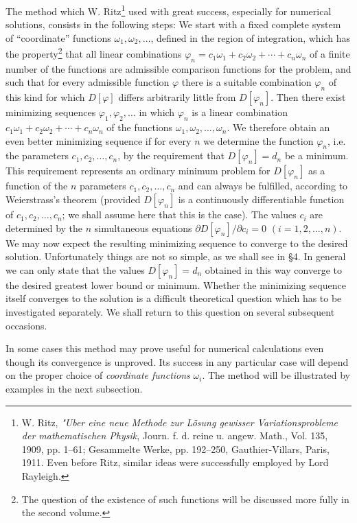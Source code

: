 The method which W. Ritz\footnote{W. Ritz, \emph{"Uber eine neue Methode zur L\"osung gewisser Variationsprobleme der mathematischen Physik}, Journ. f. d. reine u. angew. Math., Vol. 135, 1909, pp. 1--61; Gesammelte Werke, pp. 192--250, Gauthier-Villars, Paris, 1911. Even before Ritz, similar ideas were successfully employed by Lord Rayleigh.} used with great success, especially for numerical solutions, consists in the following steps: We start with a fixed complete system of ``coordinate'' functions $\omega_1,\omega_2,\ldots$, defined in the region of integration, which has the property\footnote{The question of the existence of such functions will be discussed more fully in the second volume.} that all linear combinations $\varphi_n=c_1\omega_1+c_2\omega_2+\cdots+c_n\omega_n$ of a finite number of the functions are admissible comparison functions for the problem, and such that for every admissible function $\varphi$ there is a suitable combination $\varphi_n$ of this kind for which $D[\varphi]$ differs arbitrarily little from $D[\varphi_n]$. Then there exist minimizing sequences $\varphi_1,\varphi_2,\ldots$ in which $\varphi_n$ is a linear combination $c_1\omega_1+c_2\omega_2+\cdots+c_n\omega_n$ of the functions $\omega_1,\omega_2,\ldots,\omega_n$. We therefore obtain an even better minimizing sequence if for every $n$ we determine the function $\varphi_n$, i.e. the parameters $c_1,c_2,\ldots,c_n$, by the requirement that $D[\varphi_n]=d_n$ be a minimum. This requirement represents an ordinary minimum problem for $D[\varphi_n]$ as a function of the $n$ parameters $c_1,c_2,\ldots,c_n$ and can always be fulfilled, according to Weierstrass's theorem (provided $D[\varphi_n]$ is a continuously differentiable function of $c_1,c_2,\ldots,c_n$; we shall assume here that this is the case). The values $c_i$ are determined by the $n$ simultaneous equations $\partial D[\varphi_n]/\partial c_i=0$ $(i=1,2,\ldots,n)$. We may now expect the resulting minimizing sequence to converge to the desired solution. Unfortunately things are not so simple, as we shall see in \S4. In general we can only state that the values $D[\varphi_n]=d_n$ obtained in this way converge to the desired greatest lower bound or minimum. Whether the minimizing sequence itself converges to the solution is a difficult theoretical question which has to be investigated separately. We shall return to this question on several subsequent occasions.

In some cases this method may prove useful for numerical calculations even though its convergence is unproved. Its success in any particular case will depend on the proper choice of \emph{coordinate functions} $\omega_i$. The method will be illustrated by examples in the next subsection.

